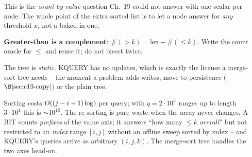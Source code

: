 \begin{observation}
This is the \emph{count-by-value} question Ch.~19 could not answer with one scalar per node.  The whole point of the extra sorted list is to let a node answer for \emph{any} threshold \(x\), not a baked-in one.
\end{observation}
\begin{observation}
\textbf{Greater-than is a complement}: \(\#(>k)=\text{len}-\#(\le k)\).  Write the count oracle for \(\le\) and reuse it; do not bisect twice.
\end{observation}
\begin{observation}
The tree is \emph{static}.  KQUERY has no updates, which is exactly the license a merge-sort tree needs -- the moment a problem adds writes, move to persistence (\(\secref{c19-copy}\)) or the plain tree.
\end{observation}

\begin{thinkbox}
{Sorting costs \(O((j-i+1)\log)\) per query; with \(q=2\cdot10^5\) ranges up to length \(3\cdot10^4\) this is \(\sim10^{10}\).  The re-sorting is pure waste when the array never changes.}
{A BIT counts \emph{prefixes} of the value axis; it answers ``how many \(\le k\) \emph{overall}'' but not restricted to an \emph{index} range \([i,j]\) without an offline sweep sorted by index -- and KQUERY's queries arrive as arbitrary \((i,j,k)\).  The merge-sort tree handles the two axes head-on.}
\end{thinkbox}

